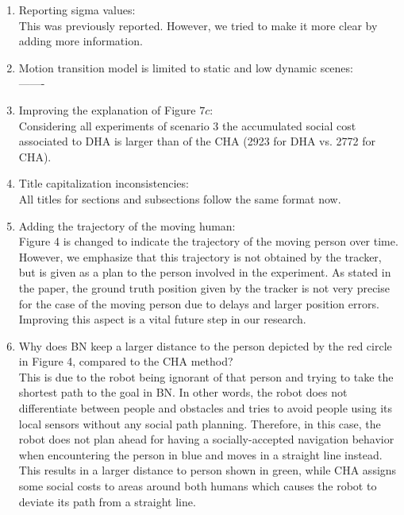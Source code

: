 \documentclass[a4paper]{article}
\begin{document}
\begin{enumerate}
  
  
  
  \item Reporting sigma values:\\ This was previously reported. However, we tried to make it more clear by adding more information.
  
  
  
  
  
  \item Motion transition model is limited to static and low dynamic scenes:\\-------
  
  
  
  
  \item Improving the explanation of Figure $7c$:\\Considering all experiments of scenario 3 the accumulated social cost associated to DHA is larger than of the CHA (2923 for DHA vs. 2772 for CHA).
  
  
  
  
  \item Title capitalization inconsistencies: \\ All titles for sections and subsections follow the same format now.
  
  
  
  \item Adding the trajectory of the moving human: \\ Figure 4 is changed to indicate the trajectory of the moving person over time. However, we emphasize that this trajectory is not obtained by the tracker, but is given as a plan to the person involved in the experiment. As stated in the paper, the ground truth position given by the tracker is not very precise for the case of the moving person due to delays and larger position errors. Improving this aspect is a vital future step in our research.  %
  
  
  
  \item Why does BN keep a larger distance to the person depicted by the red circle in Figure 4, compared to the CHA method?
  \\This is due to the robot being ignorant of that person and trying to take the shortest path to the goal in BN. In other words, the robot does not differentiate between people and obstacles and tries to avoid people using its local sensors without any social path planning. Therefore, in this case, the robot does not plan ahead for having a socially-accepted navigation behavior when encountering the person in blue and moves in a straight line instead. This results in a larger distance to person shown in green, while CHA assigns some social costs to areas around both humans which causes the robot to deviate its path from a straight line.
  

\end{enumerate}
\end{document}
